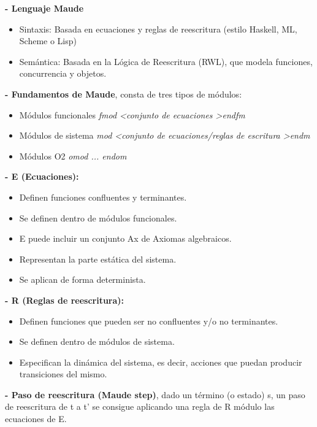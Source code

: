 \documentclass[12pt]{amsart}
\begin{document}
    \textbf{- Lenguaje Maude}

    \begin{itemize}
        \item Sintaxis: Basada en ecuaciones y reglas de reescritura
        (estilo Haskell, ML, Scheme o Lisp)
        \item Semántica: Basada en la Lógica de Reescritura (RWL), que
        modela funciones, concurrencia y objetos.
    \end{itemize}

    \textbf{- Fundamentos de Maude}, consta de tres tipos de módulos:

    \begin{itemize}
        \item Módulos funcionales \emph{fmod \textless conjunto de ecuaciones \textgreater endfm}
        \item Módulos de sistema \emph{mod \textless conjunto de ecuaciones/reglas de escritura \textgreater endm}
        \item Módulos O2 \emph{omod ... endom}
    \end{itemize}

    \textbf{- E (Ecuaciones):}
    \begin{itemize}
        \item Definen funciones confluentes y terminantes.
        \item Se definen dentro de módulos funcionales.
        \item E puede incluir un conjunto Ax de Axiomas algebraicos.
        \item Representan la parte estática del sistema.
        \item Se aplican de forma determinista.
    \end{itemize}

    \textbf{- R (Reglas de reescritura):}
    \begin{itemize}
        \item Definen funciones que pueden ser no confluentes y/o no
        terminantes.
        \item Se definen dentro de módulos de sistema.
        \item Especifican la dinámica del sistema, es decir, acciones que
        puedan producir transiciones del mismo.
    \end{itemize}

    \textbf{- Paso de reescritura (Maude step)}, dado un término (o estado) s,
    un paso de reescritura de t a t' se consigue aplicando una regla de R
    módulo las ecuaciones de E. 
\end{document}
